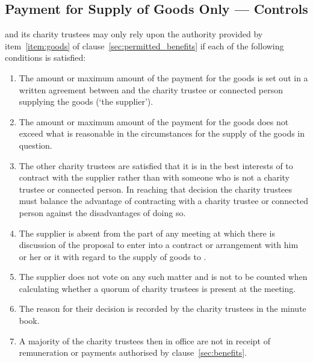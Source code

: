     \subsection{Payment for Supply of Goods Only --- Controls}\label{sec:goods_controls}
    \shortname{} and its charity trustees may only rely upon the authority provided by item~\ref{item:goods} of clause~\ref{sec:permitted_benefits} if each of the following conditions is satisfied:
    \begin{enumerate}
        \item The amount or maximum amount of the payment for the goods is set out in a written agreement between \shortname{} and the charity trustee or connected person supplying the goods (`the supplier').
        \item The amount or maximum amount of the payment for the goods does not exceed what is reasonable in the circumstances for the supply of the goods in question.
        \item The other charity trustees are satisfied that it is in the best interests of \shortname{} to contract with the supplier rather than with someone who is not a charity trustee or connected person. In reaching that decision the charity trustees must balance the advantage of contracting with a charity trustee or connected person against the disadvantages of doing so.
        \item The supplier is absent from the part of any meeting at which there is discussion of the proposal to enter into a contract or arrangement with him or her or it with regard to the supply of goods to \shortname{}.
        \item The supplier does not vote on any such matter and is not to be counted when calculating whether a quorum of charity trustees is present at the meeting.
        \item The reason for their decision is recorded by the charity trustees in the minute book.
        \item A majority of the charity trustees then in office are not in receipt of remuneration or payments authorised by clause~\ref{sec:benefits}.
    \end{enumerate}
